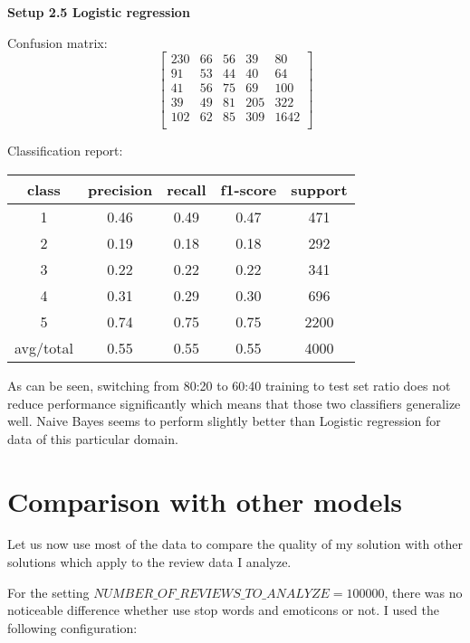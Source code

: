 \documentclass[12pt]{report}
\begin{document}
\textbf{Setup 2.5 Logistic regression}

Confusion matrix:
\[
\begin{bmatrix}
230 & 66 & 56 & 39 & 80 \\
91 & 53 & 44 & 40 & 64 \\
41 & 56 & 75 & 69 & 100 \\
39 & 49 & 81 & 205 & 322 \\
102 & 62 & 85 & 309 & 1642 \\
\end{bmatrix}
\]

Classification report:

\begin{center}
	\begin{tabular}{c | c | c | c | c }
		\hline
		class & precision & recall & f1-score & support \\ \hline
		1 & 0.46 & 0.49 & 0.47 & 471 \\ \hline
		2 & 0.19 & 0.18 & 0.18 & 292 \\ \hline
		3 & 0.22 & 0.22 & 0.22 & 341 \\ \hline
		4 & 0.31 & 0.29 & 0.30 & 696 \\ \hline
		5 & 0.74 & 0.75 & 0.75 & 2200 \\ \hline
		avg/total & 0.55 & 0.55 & 0.55 & 4000 \\ \hline
	\end{tabular}
\end{center}


As can be seen, switching from 80:20 to 60:40 training to test set ratio does not reduce performance significantly which means that those two classifiers generalize well. Naive Bayes seems to perform slightly better than Logistic regression for data of this particular domain.

\newpage

\section{Comparison with other models}

Let us now use most of the data to compare the quality of my solution with other solutions which apply to the review data I analyze.

For the setting $NUMBER\_OF\_REVIEWS\_TO\_ANALYZE = 100000$, there was no noticeable difference whether use stop words and emoticons or not. I used the following configuration:
\end{document}

